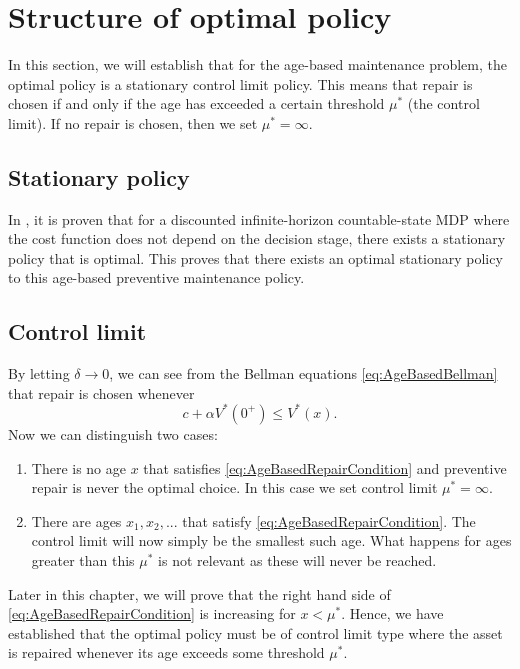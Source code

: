 \section{Structure of optimal policy}
In this section, we will establish that for the age-based maintenance problem, the optimal policy is a stationary control limit policy.
This means that repair is chosen if and only if the age has exceeded a certain threshold $\mu^*$ (the control limit).
If no repair is chosen, then we set $\mu^*=\infty$.

\subsection{Stationary policy}\label{section:AgeBasedStationaryPolicy}
In \cite{Puterman2008}, it is proven that for a discounted infinite-horizon countable-state MDP where the cost function does not depend on the decision stage, there exists a stationary policy that is optimal.
This proves that there exists an optimal stationary policy to this age-based preventive maintenance policy.

\subsection{Control limit}\label{section:AgeBasedControlLimit}
By letting $\delta\rightarrow 0$, we can see from the Bellman equations \eqref{eq:AgeBasedBellman} that repair is chosen whenever
\begin{equation}\label{eq:AgeBasedRepairCondition}
 c+\alpha V^*(0^+) \leq V^*(x). 
 \end{equation}
Now we can distinguish two cases:
\begin{enumerate}
	\item There is no age $x$ that satisfies \eqref{eq:AgeBasedRepairCondition} and preventive repair is never the optimal choice.
	In this case we set control limit $\mu^*=\infty$.
	\item There are ages $x_1,x_2,...$ that satisfy \eqref{eq:AgeBasedRepairCondition}.
	The control limit will now simply be the smallest such age.
	What happens for ages greater than this $\mu^*$ is not relevant as these will never be reached.
\end{enumerate}
Later in this chapter, we will prove that the right hand side of \eqref{eq:AgeBasedRepairCondition} is increasing for $x<\mu^*$.
Hence, we have established that the optimal policy must be of control limit type where the asset is repaired whenever its age exceeds some threshold $\mu^*$.